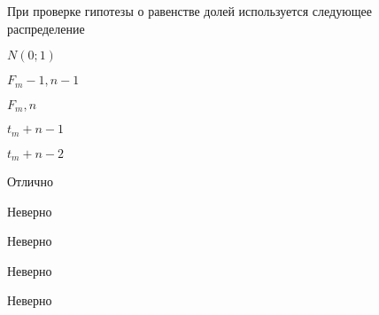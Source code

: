 
\begin{question}
При проверке гипотезы о равенстве долей используется следующее
распределение
\begin{answerlist}
  \item \(N(0;1)\)
  \item \(F_m-1,n-1\)
  \item \(F_m, n\)
  \item \(t_m+n-1\)
  \item \(t_m+n-2\)
\end{answerlist}
\end{question}

\begin{solution}
\begin{answerlist}
  \item Отлично
  \item Неверно
  \item Неверно
  \item Неверно
  \item Неверно
\end{answerlist}
\end{solution}

